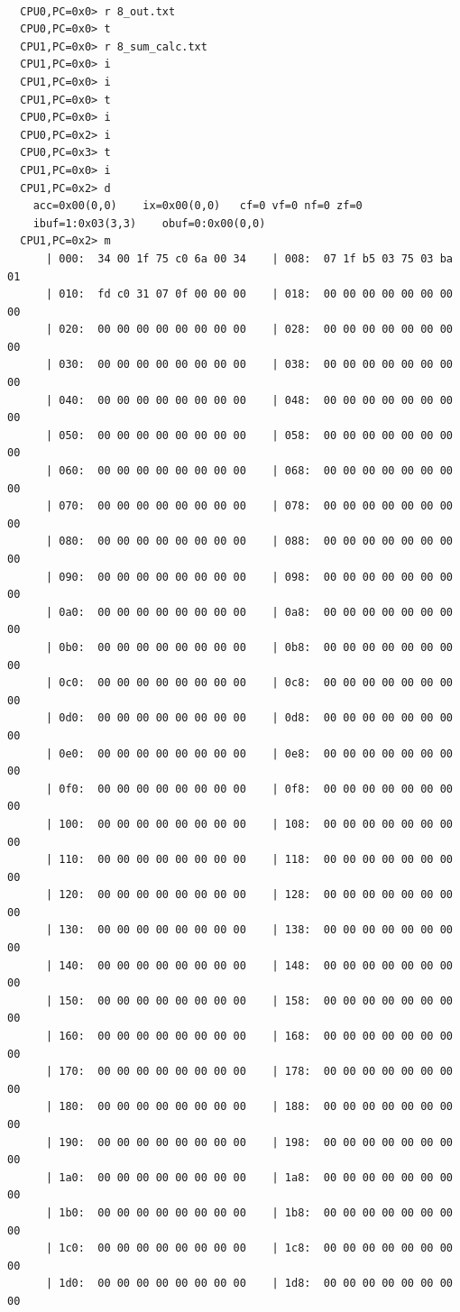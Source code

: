 \documentclass[dvipdfmx]{jsarticle}
\begin{document}
\begin{verbatim}

  CPU0,PC=0x0> r 8_out.txt
  CPU0,PC=0x0> t
  CPU1,PC=0x0> r 8_sum_calc.txt
  CPU1,PC=0x0> i
  CPU1,PC=0x0> i
  CPU1,PC=0x0> t
  CPU0,PC=0x0> i
  CPU0,PC=0x2> i
  CPU0,PC=0x3> t
  CPU1,PC=0x0> i
  CPU1,PC=0x2> d
  	acc=0x00(0,0)    ix=0x00(0,0)   cf=0 vf=0 nf=0 zf=0
  	ibuf=1:0x03(3,3)    obuf=0:0x00(0,0)
  CPU1,PC=0x2> m
      | 000:  34 00 1f 75 c0 6a 00 34    | 008:  07 1f b5 03 75 03 ba 01
      | 010:  fd c0 31 07 0f 00 00 00    | 018:  00 00 00 00 00 00 00 00
      | 020:  00 00 00 00 00 00 00 00    | 028:  00 00 00 00 00 00 00 00
      | 030:  00 00 00 00 00 00 00 00    | 038:  00 00 00 00 00 00 00 00
      | 040:  00 00 00 00 00 00 00 00    | 048:  00 00 00 00 00 00 00 00
      | 050:  00 00 00 00 00 00 00 00    | 058:  00 00 00 00 00 00 00 00
      | 060:  00 00 00 00 00 00 00 00    | 068:  00 00 00 00 00 00 00 00
      | 070:  00 00 00 00 00 00 00 00    | 078:  00 00 00 00 00 00 00 00
      | 080:  00 00 00 00 00 00 00 00    | 088:  00 00 00 00 00 00 00 00
      | 090:  00 00 00 00 00 00 00 00    | 098:  00 00 00 00 00 00 00 00
      | 0a0:  00 00 00 00 00 00 00 00    | 0a8:  00 00 00 00 00 00 00 00
      | 0b0:  00 00 00 00 00 00 00 00    | 0b8:  00 00 00 00 00 00 00 00
      | 0c0:  00 00 00 00 00 00 00 00    | 0c8:  00 00 00 00 00 00 00 00
      | 0d0:  00 00 00 00 00 00 00 00    | 0d8:  00 00 00 00 00 00 00 00
      | 0e0:  00 00 00 00 00 00 00 00    | 0e8:  00 00 00 00 00 00 00 00
      | 0f0:  00 00 00 00 00 00 00 00    | 0f8:  00 00 00 00 00 00 00 00
      | 100:  00 00 00 00 00 00 00 00    | 108:  00 00 00 00 00 00 00 00
      | 110:  00 00 00 00 00 00 00 00    | 118:  00 00 00 00 00 00 00 00
      | 120:  00 00 00 00 00 00 00 00    | 128:  00 00 00 00 00 00 00 00
      | 130:  00 00 00 00 00 00 00 00    | 138:  00 00 00 00 00 00 00 00
      | 140:  00 00 00 00 00 00 00 00    | 148:  00 00 00 00 00 00 00 00
      | 150:  00 00 00 00 00 00 00 00    | 158:  00 00 00 00 00 00 00 00
      | 160:  00 00 00 00 00 00 00 00    | 168:  00 00 00 00 00 00 00 00
      | 170:  00 00 00 00 00 00 00 00    | 178:  00 00 00 00 00 00 00 00
      | 180:  00 00 00 00 00 00 00 00    | 188:  00 00 00 00 00 00 00 00
      | 190:  00 00 00 00 00 00 00 00    | 198:  00 00 00 00 00 00 00 00
      | 1a0:  00 00 00 00 00 00 00 00    | 1a8:  00 00 00 00 00 00 00 00
      | 1b0:  00 00 00 00 00 00 00 00    | 1b8:  00 00 00 00 00 00 00 00
      | 1c0:  00 00 00 00 00 00 00 00    | 1c8:  00 00 00 00 00 00 00 00
      | 1d0:  00 00 00 00 00 00 00 00    | 1d8:  00 00 00 00 00 00 00 00

\end{verbatim}
\end{document}
